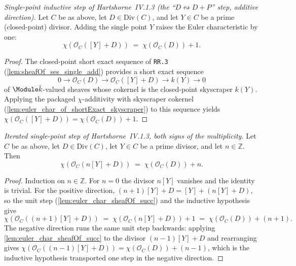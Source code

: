\begin{lemma}
  \label{lem:euler_char_sheafOf_succ}
  \textit{Single-point inductive step of Hartshorne~IV.1.3 (the
  ``\(D \leftrightsquigarrow D + P\)'' step, additive direction).}
  Let \(C\) be as above, let \(D \in \mathrm{Div}(C)\), and let \(Y \in C\)
  be a prime (closed-point) divisor. Adding the single point \(Y\) raises
  the Euler characteristic by one:
  \[
    \chi(\mathcal O_C([Y] + D)) \;=\; \chi(\mathcal O_C(D)) + 1.
  \]
\end{lemma}

\begin{proof}
  The closed-point short exact sequence of \texttt{RR.3}
  (\cref{lem:sheafOf_ses_single_add}) provides a short exact sequence
  \[
    0 \to \mathcal O_C(D) \to \mathcal O_C([Y] + D) \to k(Y) \to 0
  \]
  of \(\Module \bar k\)-valued sheaves whose cokernel is the closed-point
  skyscraper \(k(Y)\). Applying the packaged \(\chi\)-additivity with
  skyscraper cokernel (\cref{lem:euler_char_of_shortExact_skyscraper}) to
  this sequence yields
  \(\chi(\mathcal O_C([Y] + D)) = \chi(\mathcal O_C(D)) + 1\).
\end{proof}

\begin{lemma}
  \label{lem:euler_char_sheafOf_single_add}
  \textit{Iterated single-point step of Hartshorne~IV.1.3, both signs of
  the multiplicity.}
  Let \(C\) be as above, let \(D \in \mathrm{Div}(C)\), let \(Y \in C\) be
  a prime divisor, and let \(n \in \mathbb Z\). Then
  \[
    \chi(\mathcal O_C(n[Y] + D)) \;=\; \chi(\mathcal O_C(D)) + n.
  \]
\end{lemma}

\begin{proof}
  Induction on \(n \in \mathbb Z\). For \(n = 0\) the divisor \(n[Y]\)
  vanishes and the identity is trivial. For the positive direction,
  \((n+1)[Y] + D = [Y] + (n[Y] + D)\), so the unit step
  (\cref{lem:euler_char_sheafOf_succ}) and the inductive hypothesis give
  \[
    \chi(\mathcal O_C((n+1)[Y] + D))
    \;=\; \chi(\mathcal O_C(n[Y] + D)) + 1
    \;=\; \chi(\mathcal O_C(D)) + (n+1).
  \]
  The negative direction runs the same unit step backwards: applying
  \cref{lem:euler_char_sheafOf_succ} to the divisor \((n-1)[Y] + D\) and
  rearranging gives
  \(\chi(\mathcal O_C((n-1)[Y] + D)) = \chi(\mathcal O_C(D)) + (n-1)\),
  which is the inductive hypothesis transported one step in the negative
  direction.
\end{proof}

